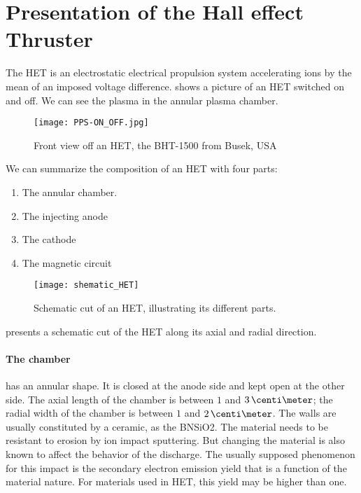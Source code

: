 

\section*{Presentation of the Hall effect Thruster }
  \label{sec-HET}

  
  The \ac{HET} is an electrostatic electrical propulsion system accelerating ions by the mean of an imposed voltage difference.
   shows a picture of an \ac{HET} switched on and off.
  We can see the plasma in the annular plasma chamber.


  \begin{figure}[hbtp]
    \centering
    \texttt{[image: PPS-ON\_OFF.jpg]}
    \caption{Front view off an \ac{HET}, the BHT-1500 from Busek, USA}
    \label{fig-bhtonoff}
  \end{figure}

  We can summarize the composition of an \ac{HET} with four parts\string:
  \begin{enumerate}
    \item The annular chamber.
    \item The injecting anode
    \item The cathode
    \item The magnetic circuit
  \end{enumerate}

  \begin{figure}[hbtp]
    \centering
    \texttt{[image: shematic\_HET]}
    \caption{Schematic cut of an \ac{HET}, illustrating its different parts. }
    \label{fig-shematiccut}
  \end{figure}

   presents a schematic cut of the \ac{HET} along its axial and radial direction.

  \paragraph{The chamber} has an annular shape.
  It is closed at the anode side and kept open at the other side.
  The axial length of the chamber is between $1$ and $3\,\centi\meter$; the radial width of the chamber is between $1$ and $2\,\centi\meter$. 
  The walls are usually constituted by a ceramic, as the \ac{BNSiO2}.
  The material needs to be resistant to erosion by ion impact sputtering.
  But changing the material is also known to affect the behavior of the discharge.
  The usually supposed phenomenon for this impact is the secondary electron emission yield that is a function of the material nature.
  For materials used in HET, this yield may be higher than one.


